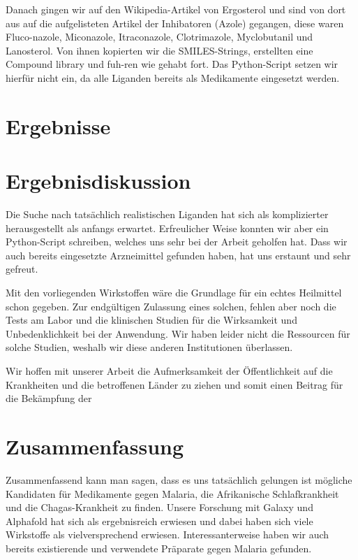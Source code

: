 \documentclass[11pt]{article}
\begin{document}
    Danach gingen wir auf den Wikipedia-Artikel von Ergosterol und sind von dort aus auf die aufgelisteten Artikel der Inhibatoren (Azole) gegangen, diese waren Fluco-nazole, Miconazole, Itraconazole, Clotrimazole, Myclobutanil und Lanosterol. Von ihnen kopierten wir die SMILES-Strings, erstellten eine Compound library und fuh-ren wie gehabt fort. Das Python-Script setzen wir hierfür nicht ein, da alle Liganden bereits als Medikamente eingesetzt werden.


    \section{Ergebnisse}\label{sec:ergebnisse}



    \section{Ergebnisdiskussion}\label{sec:ergebnisdiskussion}
    Die Suche nach tatsächlich realistischen Liganden hat sich als komplizierter herausgestellt als anfangs erwartet. Erfreulicher Weise konnten wir aber ein Python-Script schreiben, welches uns sehr bei der Arbeit geholfen hat. Dass wir auch bereits eingesetzte Arzneimittel gefunden haben, hat uns erstaunt und sehr gefreut.

    Mit den vorliegenden Wirkstoffen wäre die Grundlage für ein echtes Heilmittel schon gegeben. Zur endgültigen Zulassung eines solchen, fehlen aber noch die Tests am Labor und die klinischen Studien für die Wirksamkeit und Unbedenklichkeit bei der Anwendung. Wir haben leider nicht die Ressourcen für solche Studien, weshalb wir diese anderen Institutionen überlassen.

    Wir hoffen mit unserer Arbeit die Aufmerksamkeit der Öffentlichkeit auf die Krankheiten und die betroffenen Länder zu ziehen und somit einen Beitrag für die Bekämpfung der



    \section{Zusammenfassung}\label{sec:zusammenfassung}
    Zusammenfassend kann man sagen, dass es uns tatsächlich gelungen ist mögliche Kandidaten für Medikamente gegen Malaria, die Afrikanische Schlafkrankheit und die Chagas-Krankheit zu finden. Unsere Forschung mit Galaxy und Alphafold hat sich als ergebnisreich erwiesen und dabei haben sich viele Wirkstoffe als vielversprechend erwiesen. Interessanterweise haben wir auch bereits existierende und verwendete Präparate gegen Malaria gefunden.
\end{document}
